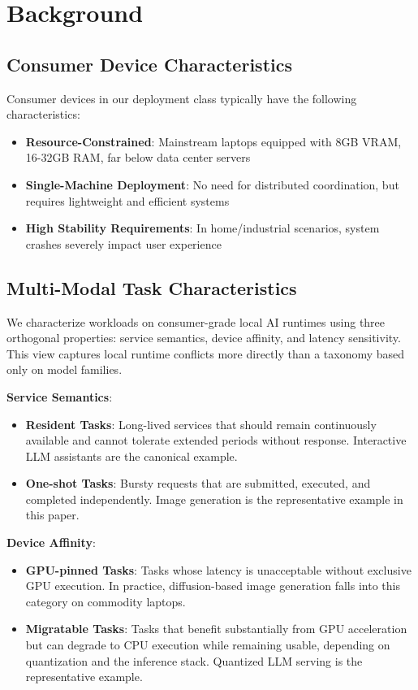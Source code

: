 \section{Background}

\subsection{Consumer Device Characteristics}

Consumer devices in our deployment class typically have the following characteristics:
\begin{itemize}
\item \textbf{Resource-Constrained}: Mainstream laptops equipped with 8GB VRAM, 16-32GB RAM, far below data center servers
\item \textbf{Single-Machine Deployment}: No need for distributed coordination, but requires lightweight and efficient systems
\item \textbf{High Stability Requirements}: In home/industrial scenarios, system crashes severely impact user experience
\end{itemize}

\subsection{Multi-Modal Task Characteristics}

We characterize workloads on consumer-grade local AI runtimes using three orthogonal properties: service semantics, device affinity, and latency sensitivity. This view captures local runtime conflicts more directly than a taxonomy based only on model families.

\textbf{Service Semantics}:
\begin{itemize}
\item \textbf{Resident Tasks}: Long-lived services that should remain continuously available and cannot tolerate extended periods without response. Interactive LLM assistants are the canonical example.
\item \textbf{One-shot Tasks}: Bursty requests that are submitted, executed, and completed independently. Image generation is the representative example in this paper.
\end{itemize}

\textbf{Device Affinity}:
\begin{itemize}
\item \textbf{GPU-pinned Tasks}: Tasks whose latency is unacceptable without exclusive GPU execution. In practice, diffusion-based image generation falls into this category on commodity laptops.
\item \textbf{Migratable Tasks}: Tasks that benefit substantially from GPU acceleration but can degrade to CPU execution while remaining usable, depending on quantization and the inference stack. Quantized LLM serving is the representative example.
\end{itemize}

